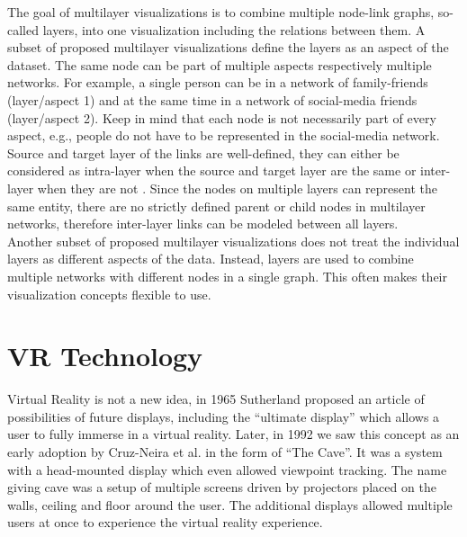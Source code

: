 The goal of multilayer visualizations \label{exp:multilayer} is to combine multiple node-link graphs, so-called layers, into one visualization including the relations between them. A subset of proposed multilayer visualizations define the layers as an aspect of the dataset. The same node can be part of multiple aspects respectively multiple networks. For example, a single person can be in a network of family-friends (layer/aspect 1) and at the same time in a network of social-media friends (layer/aspect 2). Keep in mind that each node is not necessarily part of every aspect, e.g., people do not have to be represented in the social-media network.\\
Source and target layer of the links are well-defined, they can either be considered as intra-layer when the source and target layer are the same or inter-layer when they are not \cite{ghoniem_state_2019}. Since the nodes on multiple layers can represent the same entity, there are no strictly defined parent or child nodes in multilayer networks, therefore inter-layer links can be modeled between all layers.\\
Another subset of proposed multilayer visualizations does not treat the individual layers as different aspects of the data. Instead, layers are used to combine multiple networks with different nodes in a single graph. This often makes their visualization concepts flexible to use. 

\section{VR Technology}
\label{chap:bg-vrtech}
Virtual Reality is not a new idea, in 1965 Sutherland \cite{Sutherland65theultimate} proposed an article of possibilities of future displays, including the “ultimate display” which allows a user to fully immerse in a virtual reality. Later, in 1992 we saw this concept as an early adoption by Cruz-Neira et al. \cite{cruz-neira_cave_1992} in the form of “The Cave”. It was a system with a head-mounted display which even allowed viewpoint tracking. The name giving cave was a setup of multiple screens driven by projectors placed on the walls, ceiling and floor around the user. The additional displays allowed multiple users at once to experience the virtual reality experience.  

